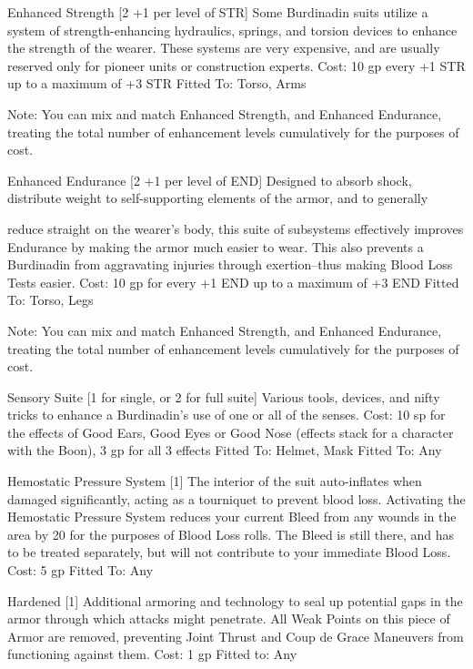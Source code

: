 \documentclass[oneside,11pt,english]{book}
\begin{document}
 

Enhanced Strength [2 +1 per level of STR] 
Some Burdinadin suits utilize a system of strength-enhancing hydraulics, springs, and torsion devices to 
enhance the strength of the wearer. These systems are very expensive, and are usually reserved only for 
pioneer units or construction experts. 
Cost: 10 gp every +1 STR up to a maximum of +3 STR 
Fitted To: Torso, Arms 

 

Note: You can mix and match Enhanced Strength, and Enhanced Endurance, treating the total number of 
enhancement levels cumulatively for the purposes of cost. 

 

Enhanced Endurance [2 +1 per level of END] 
Designed to absorb shock, distribute weight to self-supporting elements of the armor, and to generally 


reduce straight on the wearer’s body, this suite of subsystems effectively improves Endurance by making 
the armor much easier to wear. This also prevents a Burdinadin from aggravating injuries through 
exertion--thus making Blood Loss Tests easier. 
Cost: 10 gp for every +1 END up to a maximum of +3 END 
Fitted To: Torso, Legs 

 

Note: You can mix and match Enhanced Strength, and Enhanced Endurance, treating the total number of 
enhancement levels cumulatively for the purposes of cost. 

 

Sensory Suite [1 for single, or 2 for full suite] 
Various tools, devices, and nifty tricks to enhance a Burdinadin’s use of one or all of the senses. 
Cost: 10 sp for the effects of Good Ears, Good Eyes or Good Nose (effects stack for a character with the 
Boon), 3 gp for all 3 effects 
Fitted To: Helmet, Mask 
Fitted To: Any 

 

Hemostatic Pressure System [1] 
The interior of the suit auto-inflates when damaged significantly, acting as a tourniquet to prevent blood 
loss. Activating the Hemostatic Pressure System reduces your current Bleed from any wounds in the area 
by 20 for the purposes of Blood Loss rolls. The Bleed is still there, and has to be treated separately, but 
will not contribute to your immediate Blood Loss. 
Cost: 5 gp 
Fitted To: Any 

 

Hardened [1] 
Additional armoring and technology to seal up potential gaps in the armor through which attacks might 
penetrate. All Weak Points on this piece of Armor are removed, preventing Joint Thrust and Coup de 
Grace Maneuvers from functioning against them. 
Cost: 1 gp 
Fitted to: Any 
\end{document}
